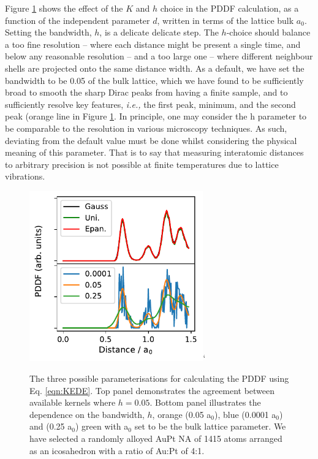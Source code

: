 Figure \ref{fig:pddf_params} shows the effect of the $K$ and $h$ choice in the PDDF calculation, as a function of the independent parameter $d$, written in terms of the lattice bulk $a_0$. 
Setting the bandwidth, $h$, is a delicate delicate step. The $h$-choice should balance a too fine resolution – where each distance might be present a single time, and below any reasonable resolution – and a too large one – where different neighbour shells are projected onto the same distance width. 
%
As a default, we have set the bandwidth to be 0.05 of the bulk lattice, which we have found to be sufficiently broad to smooth the sharp Dirac peaks from having a finite sample, and to sufficiently resolve key features, \textit{i.e.,} the first peak, minimum, and the second peak (orange line in Figure \ref{fig:pddf_params}. In principle, one may consider the h parameter to be comparable to the resolution in various microscopy techniques. As such, deviating from the default value must be done whilst considering the physical meaning of this parameter. That is to say that measuring interatomic distances to arbitrary precision is not possible at finite temperatures due to lattice vibrations.
%
\begin{figure}[ht!]
    \centering
    \includegraphics[width=7.5cm]{figures/Sapphire/PDF_Example.pdf}`
    \caption{The three possible parameterisations for calculating the PDDF using Eq. \ref{eqn:KEDE}. Top panel demonstrates the agreement between available kernels where $h=0.05$. Bottom panel illustrates the dependence on the bandwidth, $h$, orange (0.05 a$_{0}$), blue (0.0001 a$_{0}$) and (0.25 a$_0$) green with a$_{0}$ set to be the bulk lattice parameter. We have selected a randomly alloyed AuPt NA of 1415 atoms arranged as an icosahedron with a ratio of Au:Pt of 4:1.}
    \label{fig:pddf_params}
\end{figure}

